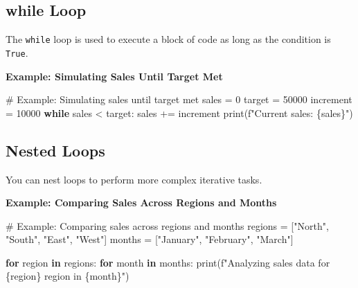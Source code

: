 \documentclass[
  letterpaper,
  DIV=11,
  numbers=noendperiod]{scrreprt}
\newenvironment{Shaded}{\begin{snugshade}}{\end{snugshade}}
\newcommand{\BuiltInTok}[1]{\textcolor[rgb]{0.00,0.23,0.31}{#1}}
\newcommand{\CommentTok}[1]{\textcolor[rgb]{0.37,0.37,0.37}{#1}}
\newcommand{\ControlFlowTok}[1]{\textcolor[rgb]{0.00,0.23,0.31}{\textbf{#1}}}
\newcommand{\DecValTok}[1]{\textcolor[rgb]{0.68,0.00,0.00}{#1}}
\newcommand{\KeywordTok}[1]{\textcolor[rgb]{0.00,0.23,0.31}{\textbf{#1}}}
\newcommand{\NormalTok}[1]{\textcolor[rgb]{0.00,0.23,0.31}{#1}}
\newcommand{\OperatorTok}[1]{\textcolor[rgb]{0.37,0.37,0.37}{#1}}
\newcommand{\SpecialCharTok}[1]{\textcolor[rgb]{0.37,0.37,0.37}{#1}}
\newcommand{\SpecialStringTok}[1]{\textcolor[rgb]{0.13,0.47,0.30}{#1}}
\newcommand{\StringTok}[1]{\textcolor[rgb]{0.13,0.47,0.30}{#1}}
\begin{document}
\subsection{while Loop}\label{while-loop-2}

The \texttt{while} loop is used to execute a block of code as long as
the condition is \texttt{True}.

\textbf{Example: Simulating Sales Until Target Met}

\begin{Shaded}
\begin{Highlighting}[]
\CommentTok{\# Example: Simulating sales until target met}
\NormalTok{sales }\OperatorTok{=} \DecValTok{0}
\NormalTok{target }\OperatorTok{=} \DecValTok{50000}
\NormalTok{increment }\OperatorTok{=} \DecValTok{10000}
\ControlFlowTok{while}\NormalTok{ sales }\OperatorTok{\textless{}}\NormalTok{ target:}
\NormalTok{    sales }\OperatorTok{+=}\NormalTok{ increment}
    \BuiltInTok{print}\NormalTok{(}\SpecialStringTok{f"Current sales: }\SpecialCharTok{\{}\NormalTok{sales}\SpecialCharTok{\}}\SpecialStringTok{"}\NormalTok{)}
\end{Highlighting}
\end{Shaded}

\subsection{Nested Loops}\label{nested-loops}

You can nest loops to perform more complex iterative tasks.

\textbf{Example: Comparing Sales Across Regions and Months}

\begin{Shaded}
\begin{Highlighting}[]
\CommentTok{\# Example: Comparing sales across regions and months}
\NormalTok{regions }\OperatorTok{=}\NormalTok{ [}\StringTok{"North"}\NormalTok{, }\StringTok{"South"}\NormalTok{, }\StringTok{"East"}\NormalTok{, }\StringTok{"West"}\NormalTok{]}
\NormalTok{months }\OperatorTok{=}\NormalTok{ [}\StringTok{"January"}\NormalTok{, }\StringTok{"February"}\NormalTok{, }\StringTok{"March"}\NormalTok{]}

\ControlFlowTok{for}\NormalTok{ region }\KeywordTok{in}\NormalTok{ regions:}
    \ControlFlowTok{for}\NormalTok{ month }\KeywordTok{in}\NormalTok{ months:}
        \BuiltInTok{print}\NormalTok{(}\SpecialStringTok{f"Analyzing sales data for }\SpecialCharTok{\{}\NormalTok{region}\SpecialCharTok{\}}\SpecialStringTok{ region in }\SpecialCharTok{\{}\NormalTok{month}\SpecialCharTok{\}}\SpecialStringTok{"}\NormalTok{)}
\end{Highlighting}
\end{Shaded}
\end{document}
